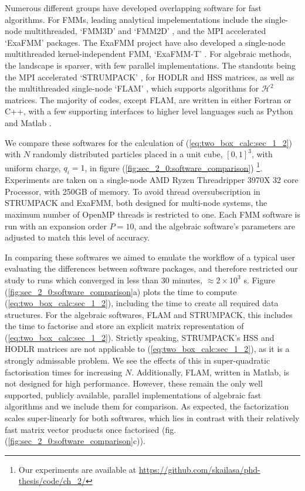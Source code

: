 Numerous different groups have developed overlapping software for fast algorithms. For FMMs, leading analytical impelementations include the single-node multithreaded, `FMM3D' and `FMM2D' \cite{fmm3d, fmm2d}, and the MPI accelerated  `ExaFMM' \cite{exafmm} packages. The ExaFMM project have also developed a single-node multithreaded kernel-independent FMM, `ExaFMM-T' \cite{wang2021exafmm}. For algebraic methods, the landscape is sparser, with few parallel implementations. The standouts being the MPI accelerated `STRUMPACK' \cite{ghyselsstrumpack}, for HODLR and HSS matrices, as well as the multithreaded single-node `FLAM' \cite{ho2020flam}, which supports algorithms for $\mathcal{H}^2$ matrices. The majority of codes, except FLAM, are written in either Fortran or C++, with a few supporting interfaces to higher level languages such as Python and Matlab \cite{wang2021exafmm,fmm3d}.

We compare these softwares for the calculation of (\ref{eq:two_box_calc:sec_1_2}) with $N$ randomly distributed particles placed in a unit cube, $[0, 1]^3$, with uniform charge, $q_i=1$, in figure (\ref{fig:sec_2_0:software_comparison}) \footnote{Our experiments are available at \url{https://github.com/skailasa/phd-thesis/code/ch_2/}}. Experiments are taken on a single-node AMD Ryzen Threadripper 3970X 32 core Processor, with 250GB of memory. To avoid thread oversubscription in STRUMPACK and ExaFMM, both designed for multi-node systems, the maximum number of OpenMP threads is restricted to one. Each FMM software is run with an expansion order $P=10$, and the algebraic software's parameters are adjusted to match this level of accuracy.

In comparing these softwares we aimed to emulate the workflow of a typical user evaluating the differences between software packages, and therefore restricted our study to runs which converged in less than 30 minutes, $\approx 2 \times 10^3$ s. Figure (\ref{fig:sec_2_0:software_comparison}a) plots the time to compute (\ref{eq:two_box_calc:sec_1_2}), including the time to create all required data structures. For the algebraic softwares, FLAM and STRUMPACK, this includes the time to factorise and store an explicit matrix representation of (\ref{eq:two_box_calc:sec_1_2}). Strictly speaking, STRUMPACK's HSS and HODLR matrices are not applicable to (\ref{eq:two_box_calc:sec_1_2}), as it is a strongly admissable problem. We see the effects of this in super-quadratic factorisation times for increasing $N$. Additionally, FLAM, written in Matlab, is not designed for high performance. However, these remain the only well supported, publicly available, parallel implementations of algebraic fast algorithms and we include them for comparison. As expected, the factorization scales super-linearly for both softwares, which lies in contrast with their relatively fast matrix vector products once factorised (fig. (\ref{fig:sec_2_0:software_comparison}c)). 

